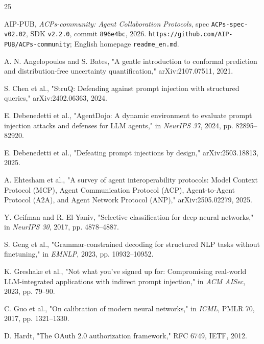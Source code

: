 \documentclass[runningheads,a4paper]{llncs}
\begin{document}
\begin{thebibliography}{25}

\small

\setlength{\itemsep}{0pt}

\setlength{\parskip}{0pt}

 AIP-PUB, \emph{ACPs-community: Agent Collaboration Protocols}, spec \texttt{ACPs-spe\allowbreak{}c-v02.02}, SDK \texttt{v2.2.0}, commit \texttt{896e4bc}, 2026. \texttt{https:/\allowbreak{}/\allowbreak{}github.com/\allowbreak{}AIP-PUB/\allowbreak{}ACPs-community}; English homepage \texttt{readme\_\allowbreak{}en.md}.

 A. N. Angelopoulos and S. Bates, "A gentle introduction to conformal prediction and distribution-free uncertainty quantification," arXiv:2107.07511, 2021.

 S. Chen et al., "StruQ: Defending against prompt injection with structured queries," arXiv:2402.06363, 2024.

 E. Debenedetti et al., "AgentDojo: A dynamic environment to evaluate prompt injection attacks and defenses for LLM agents," in \emph{NeurIPS 37}, 2024, pp. 82895--82920.

 E. Debenedetti et al., "Defeating prompt injections by design," arXiv:2503.18813, 2025.

 A. Ehtesham et al., "A survey of agent interoperability protocols: Model Context Protocol (MCP), Agent Communication Protocol (ACP), Agent-to-Agent Protocol (A2A), and Agent Network Protocol (ANP)," arXiv:2505.02279, 2025.

 Y. Geifman and R. El-Yaniv, "Selective classification for deep neural networks," in \emph{NeurIPS 30}, 2017, pp. 4878--4887.

 S. Geng et al., "Grammar-constrained decoding for structured NLP tasks without finetuning," in \emph{EMNLP}, 2023, pp. 10932--10952.

 K. Greshake et al., "Not what you've signed up for: Compromising real-world LLM-integrated applications with indirect prompt injection," in \emph{ACM AISec}, 2023, pp. 79--90.

 C. Guo et al., "On calibration of modern neural networks," in \emph{ICML}, PMLR 70, 2017, pp. 1321--1330.

 D. Hardt, "The OAuth 2.0 authorization framework," RFC 6749, IETF, 2012.


\end{thebibliography}
\end{document}
